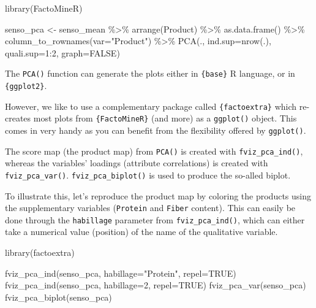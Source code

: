 \documentclass[
]{book}
\newenvironment{Shaded}{\begin{snugshade}}{\end{snugshade}}
\newcommand{\AttributeTok}[1]{\textcolor[rgb]{0.77,0.63,0.00}{#1}}
\newcommand{\ConstantTok}[1]{\textcolor[rgb]{0.00,0.00,0.00}{#1}}
\newcommand{\DecValTok}[1]{\textcolor[rgb]{0.00,0.00,0.81}{#1}}
\newcommand{\FunctionTok}[1]{\textcolor[rgb]{0.00,0.00,0.00}{#1}}
\newcommand{\NormalTok}[1]{#1}
\newcommand{\OtherTok}[1]{\textcolor[rgb]{0.56,0.35,0.01}{#1}}
\newcommand{\SpecialCharTok}[1]{\textcolor[rgb]{0.00,0.00,0.00}{#1}}
\newcommand{\StringTok}[1]{\textcolor[rgb]{0.31,0.60,0.02}{#1}}
\begin{document}
\begin{Shaded}
\begin{Highlighting}[]
\FunctionTok{library}\NormalTok{(FactoMineR)}

\NormalTok{senso\_pca }\OtherTok{\textless{}{-}}\NormalTok{ senso\_mean }\SpecialCharTok{\%\textgreater{}\%} 
  \FunctionTok{arrange}\NormalTok{(Product) }\SpecialCharTok{\%\textgreater{}\%} 
  \FunctionTok{as.data.frame}\NormalTok{() }\SpecialCharTok{\%\textgreater{}\%} 
  \FunctionTok{column\_to\_rownames}\NormalTok{(}\AttributeTok{var=}\StringTok{"Product"}\NormalTok{) }\SpecialCharTok{\%\textgreater{}\%} 
  \FunctionTok{PCA}\NormalTok{(., }\AttributeTok{ind.sup=}\FunctionTok{nrow}\NormalTok{(.), }\AttributeTok{quali.sup=}\DecValTok{1}\SpecialCharTok{:}\DecValTok{2}\NormalTok{, }\AttributeTok{graph=}\ConstantTok{FALSE}\NormalTok{)}
\end{Highlighting}
\end{Shaded}

The \texttt{PCA()} function can generate the plots either in \texttt{\{base\}} R language, or in \texttt{\{ggplot2\}}.

However, we like to use a complementary package called \texttt{\{factoextra\}} which re-creates most plots from \texttt{\{FactoMineR\}} (and more) as a \texttt{ggplot()} object. This comes in very handy as you can benefit from the flexibility offered by \texttt{ggplot()}.

The score map (the product map) from \texttt{PCA()} is created with \texttt{fviz\_pca\_ind()}, whereas the variables' loadings (attribute correlations) is created with \texttt{fviz\_pca\_var()}. \texttt{fviz\_pca\_biplot()} is used to produce the so-alled biplot.

To illustrate this, let's reproduce the product map by coloring the products using the supplementary variables (\texttt{Protein} and \texttt{Fiber} content). This can easily be done through the \texttt{habillage} parameter from \texttt{fviz\_pca\_ind()}, which can either take a numerical value (position) of the name of the qualitative variable.

\begin{Shaded}
\begin{Highlighting}[]
\FunctionTok{library}\NormalTok{(factoextra)}

\FunctionTok{fviz\_pca\_ind}\NormalTok{(senso\_pca, }\AttributeTok{habillage=}\StringTok{"Protein"}\NormalTok{, }\AttributeTok{repel=}\ConstantTok{TRUE}\NormalTok{)}
\FunctionTok{fviz\_pca\_ind}\NormalTok{(senso\_pca, }\AttributeTok{habillage=}\DecValTok{2}\NormalTok{, }\AttributeTok{repel=}\ConstantTok{TRUE}\NormalTok{)}
\FunctionTok{fviz\_pca\_var}\NormalTok{(senso\_pca)}
\FunctionTok{fviz\_pca\_biplot}\NormalTok{(senso\_pca)}
\end{Highlighting}
\end{Shaded}
\end{document}
